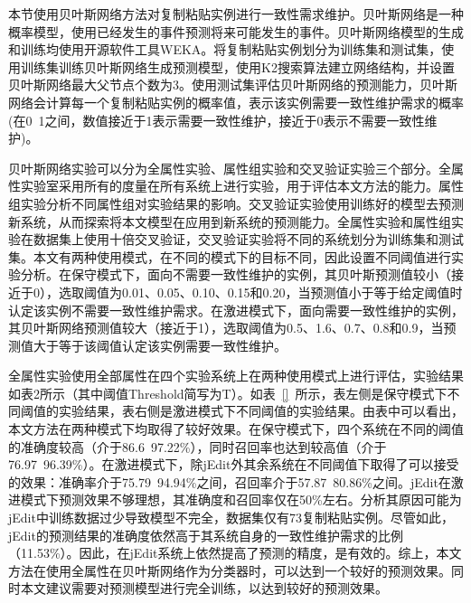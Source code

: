 本节使用贝叶斯网络方法对复制粘贴实例进行一致性需求维护。贝叶斯网络是一种概率模型，使用已经发生的事件预测将来可能发生的事件\cite{friedman1997bayesian}。贝叶斯网络模型的生成和训练均使用开源软件工具WEKA。将复制粘贴实例划分为训练集和测试集，使用训练集训练贝叶斯网络生成预测模型，使用K2搜索算法建立网络结构，并设置贝叶斯网络最大父节点个数为3。使用测试集评估贝叶斯网络的预测能力，贝叶斯网络会计算每一个复制粘贴实例的概率值，表示该实例需要一致性维护需求的概率(在0~1之间，数值接近于1表示需要一致性维护，接近于0表示不需要一致性维护)。

贝叶斯网络实验可以分为全属性实验、属性组实验和交叉验证实验三个部分。全属性实验室采用所有的度量在所有系统上进行实验，用于评估本文方法的能力。属性组实验分析不同属性组对实验结果的影响。交叉验证实验使用训练好的模型去预测新系统，从而探索将本文模型在应用到新系统的预测能力。全属性实验和属性组实验在数据集上使用十倍交叉验证，交叉验证实验将不同的系统划分为训练集和测试集。本文有两种使用模式，在不同的模式下的目标不同，因此设置不同阈值进行实验分析。在保守模式下，面向不需要一致性维护的实例，其贝叶斯预测值较小（接近于0），选取阈值为0.01、0.05、0.10、0.15和0.20，当预测值小于等于给定阈值时认定该实例不需要一致性维护需求。在激进模式下，面向需要一致性维护的实例，其贝叶斯网络预测值较大（接近于1），选取阈值为0.5、1.6、0.7、0.8和0.9，当预测值大于等于该阈值认定该实例需要一致性维护。

全属性实验使用全部属性在四个实验系统上在两种使用模式上进行评估，实验结果如表2所示（其中阈值Threshold简写为T）。如表~\ref{}~所示，表左侧是保守模式下不同阈值的实验结果，表右侧是激进模式下不同阈值的实验结果。由表中可以看出，本文方法在两种模式下均取得了较好效果。在保守模式下，四个系统在不同的阈值的准确度较高（介于86.6~97.22\%），同时召回率也达到较高值（介于76.97~96.39\%）。在激进模式下，除jEdit外其余系统在不同阈值下取得了可以接受的效果：准确率介于75.79~94.94\%之间，召回率介于57.87~80.86\%之间。jEdit在激进模式下预测效果不够理想，其准确度和召回率仅在50\%左右。分析其原因可能为jEdit中训练数据过少导致模型不完全，数据集仅有73复制粘贴实例。尽管如此，jEdit的预测结果的准确度依然高于其系统自身的一致性维护需求的比例（11.53\%）。因此，在jEdit系统上依然提高了预测的精度，是有效的。综上，本文方法在使用全属性在贝叶斯网络作为分类器时，可以达到一个较好的预测效果。同时本文建议需要对预测模型进行完全训练，以达到较好的预测效果。

